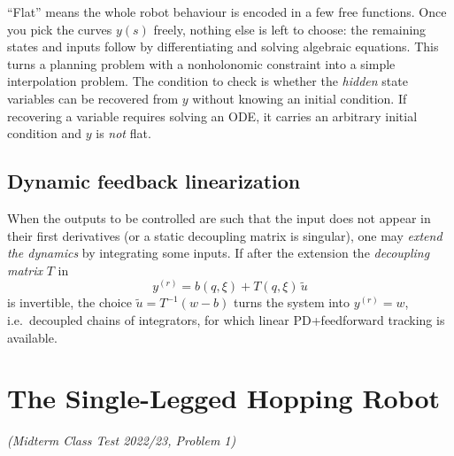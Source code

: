 \documentclass[11pt,a4paper]{article}
\def\boldsymbol#1{#1}%
\newcommand{\q}{\boldsymbol{q}}
\newcommand{\Tm}{\boldsymbol{T}}
\newcommand{\bb}{\boldsymbol{b}}
\theoremstyle{definition}
\theoremstyle{plain}
\theoremstyle{remark}
\begin{document}
\begin{intuition}
``Flat'' means the whole robot behaviour is encoded in a few free functions. Once you pick the curves $y(s)$ freely, nothing else is left to choose: the remaining states and inputs follow by differentiating and solving algebraic equations. This turns a planning problem with a nonholonomic constraint into a simple interpolation problem. The condition to check is whether the \emph{hidden} state variables can be recovered from $y$ without knowing an initial condition. If recovering a variable requires solving an ODE, it carries an arbitrary initial condition and $y$ is \emph{not} flat.
\end{intuition}

\subsection{Dynamic feedback linearization}

When the outputs to be controlled are such that the input does not appear in their first derivatives (or a static decoupling matrix is singular), one may \emph{extend the dynamics} by integrating some inputs. If after the extension the \emph{decoupling matrix} $\Tm$ in
\begin{equation}
  y^{(r)} = \bb(\q,\xi)+\Tm(\q,\xi)\,\tilde u
\end{equation}
is invertible, the choice $\tilde u=\Tm^{-1}(w-\bb)$ turns the system into $y^{(r)}=w$, i.e.\ decoupled chains of integrators, for which linear PD+feedforward tracking is available.

\section{The Single-Legged Hopping Robot}
\label{sec:hopper}
\emph{(Midterm Class Test 2022/23, Problem 1)}
\end{document}
